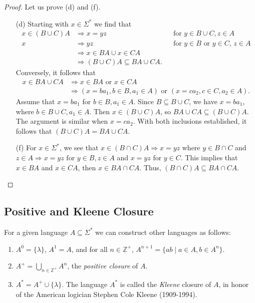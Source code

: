 \documentclass[11pt]{article}
\begin{document}
    \begin{proof}
        Let us prove (d) and (f).
        \begin{enumerate}
            \item[(d)] Starting with \(x \in \Sigma^*\) we find that
            \begin{align*}
                x \in (B \cup C)A &\Rightarrow x = yz && \text{for \(y \in B \cup C, z \in A\)} \\
                x &\Rightarrow yz && \text{for \(y \in B\) or \(y \in C\), \(z \in A\)} \\
                &\Rightarrow x \in BA \cup x \in CA \\
                &\Rightarrow (B \cup C)A \subseteq BA \cup CA.
            \end{align*} 
            Conversely, it follows that
            \begin{align*}
                x \in BA \cup CA &\Rightarrow x \in BA \text{ or } x \in CA \\
                &\Rightarrow (x = ba_1, b \in B, a_1 \in A) \text{ or } (x = ca_2, c \in C, a_2 \in A).
            \end{align*}
            Assume that \(x = ba_1\) for \(b \in B, a_1 \in A\). Since \(B \subseteq B \cup C\), we have \(x = ba_1\), where \(b \in B \cup C, a_1 \in A\). Then \(x \in (B \cup C)A\), so \(BA \cup CA \subseteq (B \cup C)A\). The argument is similar when \(x = ca_2\). With both inclusions established, it follows that \((B \cup C)A = BA \cup CA\).
            
            \item[(f)] For \(x \in \Sigma^*\), we see that \(x \in (B \cap C)A \Rightarrow x = yz\) where \(y \in B \cap C\) and \(z \in A \Rightarrow x = yz \text{ for } y \in B, z \in A\) and \(x = yz \text{ for } y \in C\). This implies that \(x \in BA\) and \(x \in CA\), then \(x \in BA \cap CA\). Thus, \((B \cap C)A \subseteq BA \cap CA\).
        \end{enumerate}
    \end{proof}

    \subsection{Positive and Kleene Closure}
    For a given language \(A \subseteq \Sigma^*\) we can construct other languages as follows:
    \begin{enumerate}
        \item \(A^0 = \{\lambda\}\), \(A^1 = A\), and for all \(n \in \mathbb{Z}^+\), \(A^{n+1} = \{ab \mid a \in A, b \in A^n\}\).
        \item \(A^+ = \bigcup_{n \in \mathbb{Z}^+} A^n\), the \emph{positive closure} of $A$.
        \item \(A^* = A^+ \cup \{\lambda\}\). The language \(A^*\) is called the \emph{Kleene} closure of $A$, in honor of the American logician Stephen Cole Kleene (1909-1994).
    \end{enumerate}
\end{document}
